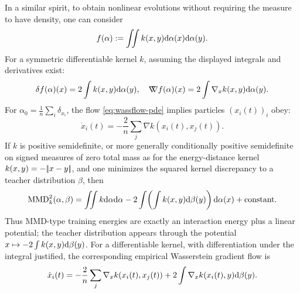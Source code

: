 In a similar spirit, to obtain nonlinear evolutions without requiring the measure to have density, one can consider
   \begin{equation}
       f(\alpha) := \iint k(x, y) \mathrm{d} \alpha(x) \mathrm{d} \alpha(y). \label{eq:quadratic-func}
   \end{equation}
   For a symmetric differentiable kernel $k$, assuming the displayed integrals and derivatives exist:
   \begin{equation*}
       \delta f(\alpha)(x) = 2 \int k(x, y) \mathrm{d} \alpha(y), \quad \mathord{\nabla\mkern-9.3mu\nabla} f(\alpha)(x) = 2 \int \nabla_x k(x, y) \mathrm{d} \alpha(y).
   \end{equation*}
   For $\alpha_0 = \frac{1}{n} \sum_i \delta_{x_i}$, the flow \eqref{eq:wassflow-pde} implies particles $(x_i(t))_i$ obey:
   \begin{equation*}
       \dot{x}_i(t) = -\frac{2}{n} \sum_j \nabla k(x_i(t), x_j(t)).
   \end{equation*}
	   If $k$ is positive semidefinite, or more generally conditionally positive semidefinite on signed measures of zero total mass as for the energy-distance kernel $k(x,y)=-|\!| x-y |\!|$, and one minimizes the squared kernel discrepancy to a teacher distribution $\beta$, then
   \[
       \operatorname{MMD}_k^2(\alpha,\beta)
       =
       \iint k\mathrm{d}\alpha\mathrm{d}\alpha
       -2\int\!\left(\int k(x,y)\mathrm{d}\beta(y)\right)\mathrm{d}\alpha(x)
       +\mathrm{constant}.
       \]
	       Thus MMD-type training energies are exactly an interaction energy plus a linear potential; the teacher distribution appears through the potential $x\mapsto-2\int k(x,y)\mathrm{d}\beta(y)$. For a differentiable kernel, with differentiation under the integral justified, the corresponding empirical Wasserstein gradient flow is
       \[
		\dot x_i(t)
		=
		-\frac{2}{n}\sum_j\nabla_x k(x_i(t),x_j(t))
		+
		2\int\nabla_x k(x_i(t),y)\mathrm{d}\beta(y).
       \]



